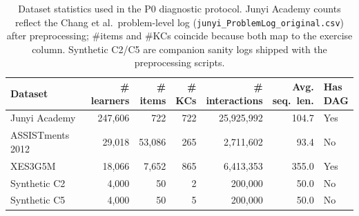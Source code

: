 \begin{table}[t]
\centering
\caption{Dataset statistics used in the P0 diagnostic protocol. Junyi Academy counts reflect the Chang et al.\ problem-level log (\texttt{junyi\_ProblemLog\_original.csv}) after preprocessing; \#items and \#KCs coincide because both map to the exercise column. Synthetic C2/C5 are companion sanity logs shipped with the preprocessing scripts.}
\label{tab:dataset-stats}
\footnotesize
\setlength{\tabcolsep}{3pt}
\begin{tabularx}{\linewidth}{@{} >{\RaggedRight\arraybackslash}X rrrrr >{\centering\arraybackslash}X @{}}
\toprule
Dataset & \makecell[r]{\#\\learners} & \makecell[r]{\#\\items} & \makecell[r]{\#\\KCs} & \makecell[r]{\#\\interactions} & \makecell[r]{Avg.\\seq.\ len.} & \makecell{Has\\DAG} \\
\midrule
Junyi Academy & 247,606 & 722 & 722 & 25,925,992 & 104.7 & Yes \\
ASSISTments 2012 & 29,018 & 53,086 & 265 & 2,711,602 & 93.4 & No \\
XES3G5M & 18,066 & 7,652 & 865 & 6,413,353 & 355.0 & Yes \\
Synthetic C2 & 4,000 & 50 & 2 & 200,000 & 50.0 & No \\
Synthetic C5 & 4,000 & 50 & 5 & 200,000 & 50.0 & No \\
\bottomrule
\end{tabularx}
\end{table}
